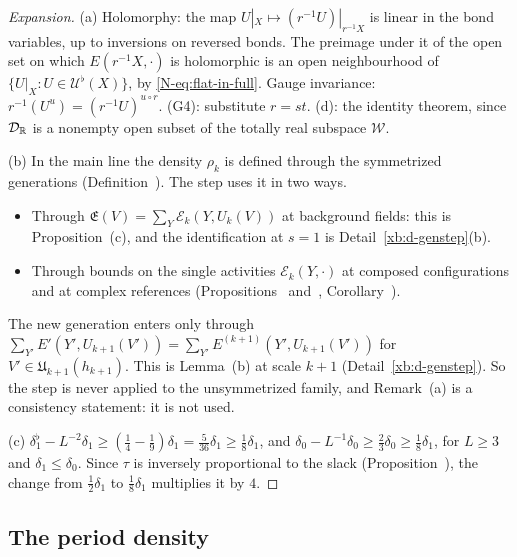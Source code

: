 \begin{proof}[Expansion]
(a) Holomorphy: the map $U|_X\mapsto(r^{-1}U)|_{r^{-1}X}$ is linear in the bond variables, up to inversions on reversed bonds. The preimage under it of the open set on which $E(r^{-1}X,\cdot)$ is holomorphic is an open neighbourhood of $\{U|_X:U\in\mathcal U^\flat(X)\}$, by \eqref{N-eq:flat-in-full}. Gauge invariance: $r^{-1}(U^u)=(r^{-1}U)^{u\circ r}$. (G4): substitute $r=st$. (d): the identity theorem, since $\mathcal D_\mathbb R$ is a nonempty open subset of the totally real subspace $\mathcal W$.

(b) In the main line the density $\rho_k$ is defined through the symmetrized generations (Definition~). The step uses it in two ways.
\begin{itemize}
\item Through $\mathfrak E(V)=\sum_Y\mathcal E_k(Y,U_k(V))$ at background fields: this is Proposition~(c), and the identification at $s=1$ is Detail~\ref{xb:d-genstep}(b).
\item Through bounds on the single activities $\mathcal E_k(Y,\cdot)$ at composed configurations and at complex references (Propositions~ and~, Corollary~).
\end{itemize}
The new generation enters only through $\sum_{Y'}E'(Y',U_{k+1}(V'))=\sum_{Y'}E^{(k+1)}(Y',U_{k+1}(V'))$ for $V'\in\mathfrak U_{k+1}(h_{k+1})$. This is Lemma~(b) at scale $k+1$ (Detail~\ref{xb:d-genstep}). So the step is never applied to the unsymmetrized family, and Remark~(a) is a consistency statement: it is not used.

(c) $\delta_1^\flat-L^{-2}\delta_1\ge(\frac14-\frac19)\delta_1=\frac5{36}\delta_1\ge\frac18\delta_1$, and $\delta_0-L^{-1}\delta_0\ge\frac23\delta_0\ge\frac18\delta_1$, for $L\ge3$ and $\delta_1\le\delta_0$. Since $\tau$ is inversely proportional to the slack (Proposition~), the change from $\frac12\delta_1$ to $\frac18\delta_1$ multiplies it by $4$.
\end{proof}

\subsection{The period density}\label{xb:period}

